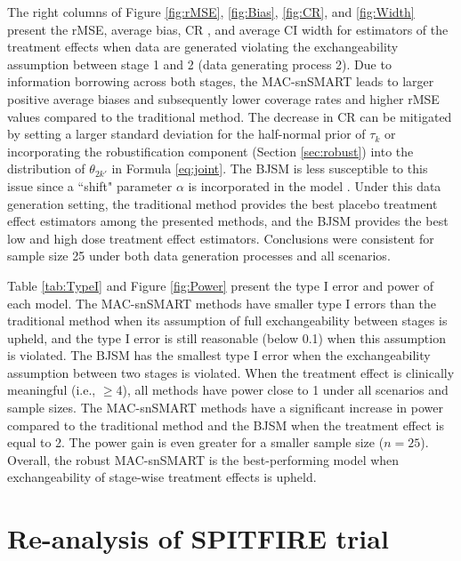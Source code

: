 The right columns of Figure \ref{fig:rMSE}, \ref{fig:Bias}, \ref{fig:CR}, and \ref{fig:Width} present the \ac{rMSE}, average bias,  \ac{CR} , and average \ac{CI} width for estimators of the treatment effects when data are generated violating the exchangeability assumption between stage 1 and 2 (data generating process 2). Due to information borrowing across both stages, the MAC-snSMART leads to larger positive average biases and subsequently lower coverage rates and higher \ac{rMSE} values compared to the traditional method. The decrease in  \ac{CR}  can be mitigated by setting a larger standard deviation for the half-normal prior of $\tau_k$ or incorporating the robustification component (Section \ref{sec:robust}) into the distribution of $\theta_{2k'}$ in Formula \ref{eq:joint}. The \ac{BJSM} is less susceptible to this issue since a ``shift" parameter $\alpha$ is incorporated in the model \citep{fang2023comparing}. Under this data generation setting, the traditional method provides the best placebo treatment effect estimators among the presented methods, and the \ac{BJSM} provides the best low and high dose treatment effect estimators. Conclusions were consistent for sample size 25 under both data generation processes and all scenarios.

Table \ref{tab:TypeI} and Figure \ref{fig:Power} present the type I error and power of each model. The MAC-snSMART methods have smaller type I errors than the traditional method when its assumption of full exchangeability between stages is upheld, and the type I error is still reasonable (below 0.1) when this assumption is violated. The \ac{BJSM} has the smallest type I error when the exchangeability assumption between two stages is violated. When the treatment effect is clinically meaningful (i.e., $\geqslant 4$), all methods have power close to 1 under all scenarios and sample sizes. The MAC-snSMART methods have a significant increase in power compared to the traditional method and the \ac{BJSM} when the treatment effect is equal to 2. The power gain is even greater for a smaller sample size ($n=25$). Overall, the robust MAC-snSMART is the best-performing model when exchangeability of stage-wise treatment effects is upheld.

\section{Re-analysis of SPITFIRE trial} \label{s:example}

